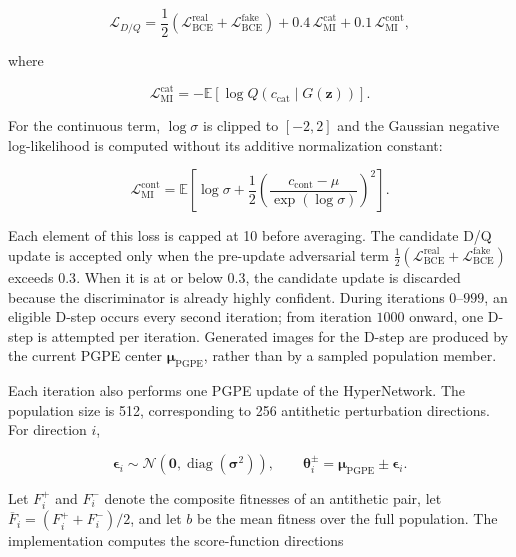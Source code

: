 \begin{equation}
\mathcal{L}_{D/Q}
= \frac{1}{2}\left(
\mathcal{L}_{\text{BCE}}^{\text{real}}
+ \mathcal{L}_{\text{BCE}}^{\text{fake}}
\right)
+ 0.4\,\mathcal{L}_{\text{MI}}^{\text{cat}}
+ 0.1\,\mathcal{L}_{\text{MI}}^{\text{cont}},
\label{eq:dq_loss}
\end{equation}

where

\begin{equation}
\mathcal{L}_{\text{MI}}^{\text{cat}}
= -\mathbb{E}\!\left[
\log Q(c_{\text{cat}}\mid G(\mathbf{z}))
\right].
\end{equation}

For the continuous term, $\log\sigma$ is clipped to $[-2,2]$ and the Gaussian negative log-likelihood is computed without its additive normalization constant:

\begin{equation}
\mathcal{L}_{\text{MI}}^{\text{cont}}
= \mathbb{E}\!\left[
\log\sigma
+ \frac{1}{2}
\left(\frac{c_{\text{cont}}-\mu}{\exp(\log\sigma)}\right)^2
\right].
\end{equation}

Each element of this loss is capped at 10 before averaging. The candidate D/Q update is accepted only when the pre-update adversarial term
$\frac{1}{2}(\mathcal{L}_{\text{BCE}}^{\text{real}}+
\mathcal{L}_{\text{BCE}}^{\text{fake}})$ exceeds $0.3$. When it is at or below $0.3$, the candidate update is discarded because the discriminator is already highly confident. During iterations $0$--$999$, an eligible D-step occurs every second iteration; from iteration $1000$ onward, one D-step is attempted per iteration. Generated images for the D-step are produced by the current PGPE center $\boldsymbol{\mu}_{\text{PGPE}}$, rather than by a sampled population member.

Each iteration also performs one PGPE update of the HyperNetwork. The population size is 512, corresponding to 256 antithetic perturbation directions. For direction $i$,

\begin{equation}
\boldsymbol{\epsilon}_i
\sim \mathcal{N}\!\left(\mathbf{0},
\operatorname{diag}(\boldsymbol{\sigma}^2)\right),
\qquad
\boldsymbol{\theta}_i^{\pm}
= \boldsymbol{\mu}_{\text{PGPE}} \pm \boldsymbol{\epsilon}_i.
\end{equation}

Let $F_i^+$ and $F_i^-$ denote the composite fitnesses of an antithetic pair, let
$\overline{F}_i=(F_i^++F_i^-)/2$, and let $b$ be the mean fitness over the full population. The implementation computes the score-function directions

